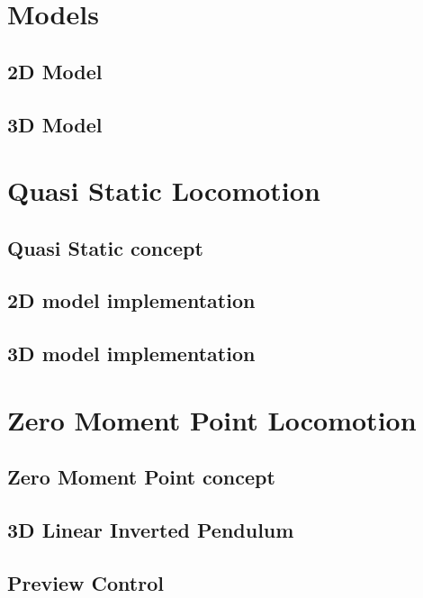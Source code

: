 \documentclass{UoNMCHA}
\begin{document}
	\newpage\section{Models}\label{sec:Models}
		
		\subsection{2D Model}
			
		\subsection{3D Model}
			
	
	\clearpage\section{Quasi Static Locomotion}\label{sec:Quasi Static Locomotion}
		\subsection{Quasi Static concept}
			
		\subsection{2D model implementation}
			
		\subsection{3D model implementation}
			
	
	\newpage\section{Zero Moment Point Locomotion}\label{sec:Zero Moment Point Locomotion}
		\subsection{Zero Moment Point concept}
			
		\subsection{3D Linear Inverted Pendulum}
			
		\subsection{Preview Control}
			
\end{document}
